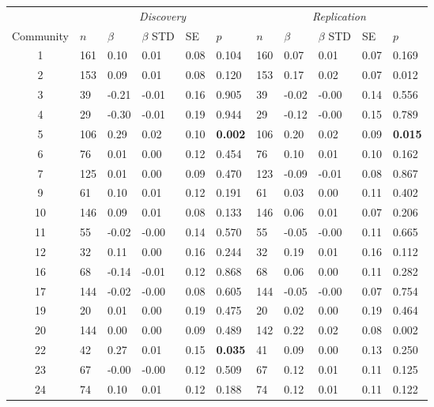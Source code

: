 \begin{table}[ht]
\centering
\setlength{\extrarowheight}{2pt}
\begin{tabular}{cllllllllll}
  \toprule
   &  \multicolumn{5}{c}{\textit{Discovery}} & \multicolumn{5}{c}{\textit{Replication}} \\
    \cmidrule{2-11}
Community & $n$ & $\beta$ & $\beta$ STD & SE & $p$ & $n$ & $\beta$ & $\beta$ STD & SE & $p$\\ 
  \midrule
1 & 161 & 0.10 & 0.01 & 0.08 & 0.104 & 160 & 0.07 & 0.01 & 0.07 & 0.169 \\ 
  2 & 153 & 0.09 & 0.01 & 0.08 & 0.120 & 153 & 0.17 & 0.02 & 0.07 & 0.012 \\ 
  3 & 39 & -0.21 & -0.01 & 0.16 & 0.905 & 39 & -0.02 & -0.00 & 0.14 & 0.556 \\ 
  4 & 29 & -0.30 & -0.01 & 0.19 & 0.944 & 29 & -0.12 & -0.00 & 0.15 & 0.789 \\ 
  5 & 106 & 0.29 & 0.02 & 0.10 & \textbf{0.002} & 106 & 0.20 & 0.02 & 0.09 & \textbf{0.015} \\ 
  6 & 76 & 0.01 & 0.00 & 0.12 & 0.454 & 76 & 0.10 & 0.01 & 0.10 & 0.162 \\ 
  7 & 125 & 0.01 & 0.00 & 0.09 & 0.470 & 123 & -0.09 & -0.01 & 0.08 & 0.867 \\ 
  9 & 61 & 0.10 & 0.01 & 0.12 & 0.191 & 61 & 0.03 & 0.00 & 0.11 & 0.402 \\ 
  10 & 146 & 0.09 & 0.01 & 0.08 & 0.133 & 146 & 0.06 & 0.01 & 0.07 & 0.206 \\ 
  11 & 55 & -0.02 & -0.00 & 0.14 & 0.570 & 55 & -0.05 & -0.00 & 0.11 & 0.665 \\ 
  12 & 32 & 0.11 & 0.00 & 0.16 & 0.244 & 32 & 0.19 & 0.01 & 0.16 & 0.112 \\ 
  16 & 68 & -0.14 & -0.01 & 0.12 & 0.868 & 68 & 0.06 & 0.00 & 0.11 & 0.282 \\ 
  17 & 144 & -0.02 & -0.00 & 0.08 & 0.605 & 144 & -0.05 & -0.00 & 0.07 & 0.754 \\ 
  19 & 20 & 0.01 & 0.00 & 0.19 & 0.475 & 20 & 0.02 & 0.00 & 0.19 & 0.464 \\ 
  20 & 144 & 0.00 & 0.00 & 0.09 & 0.489 & 142 & 0.22 & 0.02 & 0.08 & 0.002 \\ 
  22 & 42 & 0.27 & 0.01 & 0.15 & \textbf{0.035} & 41 & 0.09 & 0.00 & 0.13 & 0.250 \\ 
  23 & 67 & -0.00 & -0.00 & 0.12 & 0.509 & 67 & 0.12 & 0.01 & 0.11 & 0.125 \\ 
  24 & 74 & 0.10 & 0.01 & 0.12 & 0.188 & 74 & 0.12 & 0.01 & 0.11 & 0.122 \\ 

\end{tabular}
\end{table}
